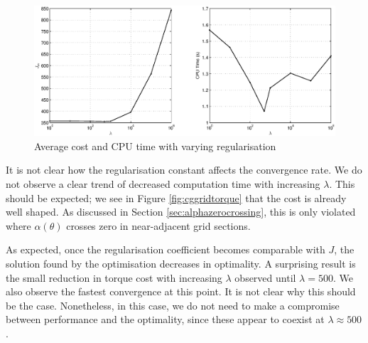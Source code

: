 \begin{figure}
\centering
\includegraphics[width=\linewidth]{7Results/reg}
\caption{Average cost and CPU time with varying regularisation}
\label{fig:reg}
\end{figure}

It is not clear how the regularisation constant affects the convergence rate. We do not observe a clear trend of decreased computation time with increasing $\lambda$. This should be expected; we see in Figure \ref{fig:cggridtorque} that the cost is already well shaped. As discussed in Section \ref{sec:alphazerocrossing}, this is only violated where $\alpha(\theta)$ crosses zero in near-adjacent grid sections.

As expected, once the regularisation coefficient becomes comparable with $J$, the solution found by the optimisation decreases in optimality. A surprising result is the small reduction in torque cost with increasing $\lambda$ observed until $\lambda=500$. We also observe the fastest convergence at this point. It is not clear why this should be the case. Nonetheless, in this case, we do not need to make a compromise between performance and the optimality, since these appear to coexist at $\lambda\approx500$.